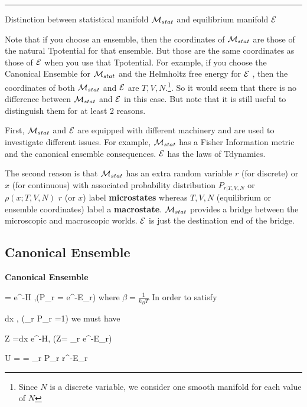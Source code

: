 \begin{enumerate}
\hrule
Distinction between 
statistical manifold
${\cal M}_{stat}$
and equilibrium manifold ${\cal E}$

Note that if you choose 
an ensemble, then the coordinates of ${\cal M}_{stat}$ are those of the natural Tpotential for that 
ensemble. But those are 
the same coordinates as those
of ${\cal E}$ when you
use that Tpotential.
For example, if you choose the Canonical Ensemble for ${\cal M}_{stat}$ and
the Helmholtz free energy for ${\cal E}$ , then the coordinates of both
${\cal M}_{stat}$ and ${\cal E}$
are $T, V, N$.\footnote{Since $N$ is a discrete variable, we consider one smooth manifold for each value of $N$}.
So it would seem that there is no difference between ${\cal M}_{stat}$
and ${\cal E}$ in this case.
But note that it is still
useful to distinguish them for at least 2 reasons. 

First, ${\cal M}_{stat}$
and ${\cal E}$ are equipped with
different machinery and are used to investigate
different issues. 
For example, ${\cal M}_{stat}$ has a Fisher Information metric and the canonical ensemble consequences. ${\cal E}$ has the laws of Tdynamics. 

The second reason is that ${\cal M}_{stat}$ has an extra random variable $r$ (for discrete)
or $x$ (for continuous) with associated probability distribution $P_{r|T, V, N}$ or $\rho(x; T, V, N)$ 
$r$ (or $x$) label
{\bf microstates}
whereas $T,V, N$
(equilibrium or ensemble coordinates)
label a {\bf macrostate}.
${\cal M}_{stat}$
provides a bridge between
the microscopic and macroscopic worlds.
${\cal E}$ is just the destination end of the bridge.


 



\end{enumerate}

\subsection{Canonical Ensemble}

{\bf Canonical Ensemble}

\beq
\rho =
 e^{-\beta H}
,\quad (P_r =  e^{-\beta E_r})
\eeq
where $
\beta = \frac{1}{k_B T}$
In order to satisfy

\beq
\int dx\; ,
\quad (\sum _r P_r =1)
\eeq
we must have

\beq
Z =\int dx \; e^{-\beta H},
\quad (Z= \sum_r 
e^{-\beta E_r})
\eeq

\beq
U = = \sum_r P_r r^{-\beta E_r}
\eeq

